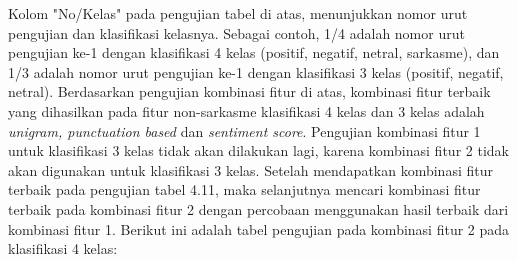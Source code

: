 Kolom "No/Kelas" pada pengujian tabel di atas, menunjukkan nomor urut pengujian dan klasifikasi kelasnya. Sebagai contoh, 1/4 adalah nomor urut pengujian ke-1 dengan klasifikasi 4 kelas (positif, negatif, netral, sarkasme), dan 1/3 adalah nomor urut pengujian ke-1 dengan klasifikasi 3 kelas (positif, negatif, netral). Berdasarkan pengujian kombinasi fitur di atas, kombinasi fitur terbaik yang dihasilkan pada fitur non-sarkasme klasifikasi 4 kelas dan 3 kelas adalah \textit{unigram, punctuation based }dan \textit{sentiment score}. Pengujian kombinasi fitur 1 untuk klasifikasi 3 kelas tidak akan dilakukan lagi, karena kombinasi fitur 2 tidak akan digunakan untuk klasifikasi 3 kelas. Setelah mendapatkan kombinasi fitur terbaik pada pengujian tabel 4.11, maka selanjutnya mencari kombinasi fitur terbaik pada kombinasi fitur 2\textit{ }dengan percobaan menggunakan hasil terbaik dari kombinasi fitur 1. Berikut ini adalah tabel pengujian pada kombinasi fitur 2 pada klasifikasi 4 kelas:
